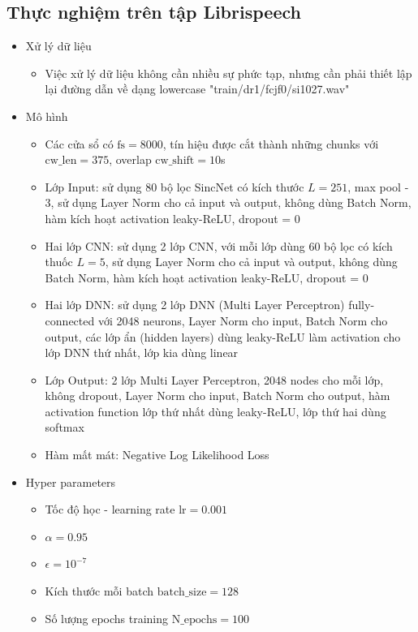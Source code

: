 \documentclass{article}
\begin{document}
	\subsection{Thực nghiệm trên tập Librispeech}
	\begin{itemize}
		\item Xử lý dữ liệu
		\begin{itemize}
			\item Việc xử lý dữ liệu không cần nhiều sự phức tạp, nhưng cần phải thiết lập lại đường dẫn về dạng lowercase "train/dr1/fcjf0/si1027.wav"
		\end{itemize}
		\item Mô hình 
		\begin{itemize}
			\item Các cửa sổ có $\text{fs} = 8000$, tín hiệu được cắt thành những chunks với $\text{cw\_len}=375$, overlap $\text{cw\_shift}=10$s
			\item Lớp Input: sử dụng 80 bộ lọc SincNet có kích thước $L=251$, max pool - 3, sử dụng Layer Norm cho cả input và output, không dùng Batch Norm, hàm kích hoạt activation leaky-ReLU, dropout = 0
			\item Hai lớp CNN: sử dụng 2 lớp CNN, với mỗi lớp dùng 60 bộ lọc có kích thuốc $L=5$, sử dụng Layer Norm cho cả input và output, không dùng Batch Norm, hàm kích hoạt activation leaky-ReLU, dropout = 0
			\item Hai lớp DNN: sử dụng 2 lớp DNN (Multi Layer Perceptron) fully-connected với 2048 neurons, Layer Norm cho input, Batch Norm cho output, các lớp ẩn (hidden layers) dùng leaky-ReLU làm activation cho lớp DNN thứ nhất, lớp kia dùng linear
			\item Lớp Output: 2 lớp Multi Layer Perceptron, 2048 nodes cho mỗi lớp, không dropout, Layer Norm cho input, Batch Norm cho output, hàm activation function lớp thứ nhất dùng leaky-ReLU, lớp thứ hai dùng softmax
			\item Hàm mất mát: Negative Log Likelihood Loss
		\end{itemize}
		\item Hyper parameters
		\begin{itemize}
			\item Tốc độ học - learning rate $\text{lr} = 0.001$
			\item $\alpha = 0.95$
			\item $\epsilon = 10^{-7}$
			\item Kích thước mỗi batch $\text{batch\_size}=128$
			\item Số lượng epochs training $\text{N\_epochs}=100$

\end{itemize}
\end{itemize}
\end{document}
